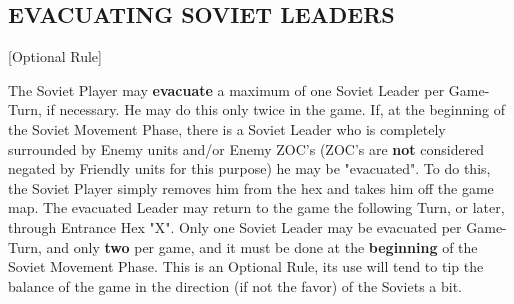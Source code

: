 \subsection{EVACUATING SOVIET LEADERS} [Optional Rule]

The Soviet Player may \textbf{evacuate} a maximum of one Soviet Leader per Game-Turn, if necessary. He may do this only twice in the game. If, at the beginning of the Soviet Movement Phase, there is a Soviet Leader who is completely surrounded by Enemy units and/or Enemy ZOC's (ZOC's are \textbf{not} considered negated by Friendly units for this purpose) he may be "evacuated". To do this, the Soviet Player simply removes him from the hex and takes him off the game map. The evacuated Leader may return to the game the following Turn, or later, through Entrance Hex "X". Only one Soviet Leader may be evacuated per Game-Turn, and only \textbf{two} per game, and it must be done at the \textbf{beginning} of the Soviet Movement Phase. This is an Optional Rule, its use will tend to tip the balance of the game in the direction (if not the favor) of the Soviets a bit.

